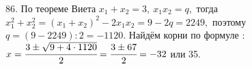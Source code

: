 86. По теореме Виета $x_1+x_2=3,\ x_1x_2=q,$ тогда $x_1^2+x_2^2=(x_1+x_2)^2-2x_1x_2=9-2q=2249,$ поэтому $q=(9-2249):2=-1120.$ Найдём корни по формуле : $x=\cfrac{3\pm\sqrt{9+4\cdot1120}}{2}=\cfrac{3\pm67}{2}=-32$ или 35.\\
